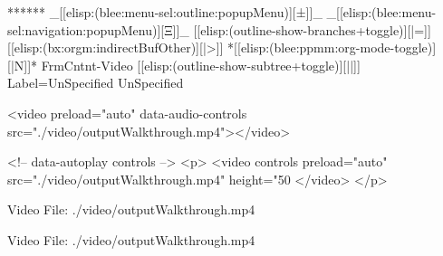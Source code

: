 \begin{whenOrg}
\begin{frame}[fragile,plain,label=outputFormsWalkthrough]
\begin{whenOrg}
******  _[[elisp:(blee:menu-sel:outline:popupMenu)][±]]_ _[[elisp:(blee:menu-sel:navigation:popupMenu)][Ξ]]_ [[elisp:(outline-show-branches+toggle)][|=]] [[elisp:(bx:orgm:indirectBufOther)][|>]] *[[elisp:(blee:ppmm:org-mode-toggle)][|N]]*  FrmCntnt-Video [[elisp:(outline-show-subtree+toggle)][||]] Label=UnSpecified UnSpecified
\end{whenOrg}
\begin{presentationMode}
\begin{htmlonly}
  \begin{rawhtml}
<video preload="auto" data-audio-controls src="./video/outputWalkthrough.mp4"></video>
  \end{rawhtml}
\end{htmlonly}
\end{presentationMode}

\begin{articleMode}
\begin{htmlonly}
  \begin{rawhtml}
      <!-- data-autoplay  controls -->
    <p>
    <video  controls   preload="auto"  src="./video/outputWalkthrough.mp4"  height="50%
    </video>
    </p>
  \end{rawhtml}
\end{htmlonly}
\end{articleMode}

\begin{presentationMode}
\begin{latexonly}
    \begin{center}
      Video File: ./video/outputWalkthrough.mp4
    \end{center}
\end{latexonly}
\end{presentationMode}

\begin{articleMode}
\begin{latexonly}
    \begin{center}
      Video File: ./video/outputWalkthrough.mp4
    \end{center}
\end{latexonly}
\end{articleMode}

\end{frame}
\end{whenOrg}

